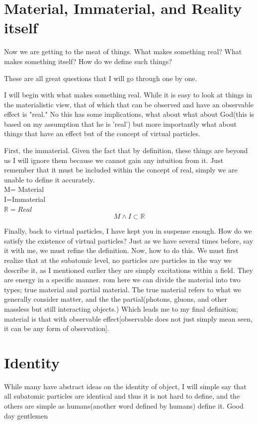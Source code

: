 \section{Material, Immaterial, and Reality itself}
\par Now we are getting to the meat of things. What makes something real? What makes something itself? How do we define such things?
\par These are all great questions that I will go through one by one.
\par I will begin with what makes something real. While it is easy to look at things in the materialistic view, that of which that can be observed and have an observable effect is "real." No this has some implications, what about what about God(this is based on my assumption that he is 'real') but more importantly what about things that have an effect but of the concept of virtual particles.
\par First, the immaterial. Given the fact that by definition, these things are beyond us I will ignore them because we cannot gain any intuition from it. Just remember that it must be included within the concept of real, simply we are unable to define it accurately.\\
M= Material\\
I=Immaterial\\
$\mathbb{R}= Real$
$$
M \land I\subset \mathbb{R}
$$
\par Finally, back to virtual particles, I have kept you in suspense enough. How do we satisfy the existence of virtual particles? Just as we have several times before, say it with me, we must refine the definition. Now, how to do this. We must first realize that at the subatomic level, no particles are particles in the way we describe it, as I mentioned earlier they are simply excitations within a field. They are energy in a specific manner. rom here we can divide the material into two types; true material and partial material. The true material refers to what we generally consider matter, and the the partial(photons, gluons, and other massless but still interacting objects.) Which leads me to my final definition; material is that with observable effect[observable does not just simply mean seen, it can be any form of observation].
\section{Identity}
\par While many have abstract ideas on the identity of object, I will simple say that all subatomic particles are identical and thus it is not hard to define, and the others are simple as humans(another word defined by humans) define it. Good day gentlemen
